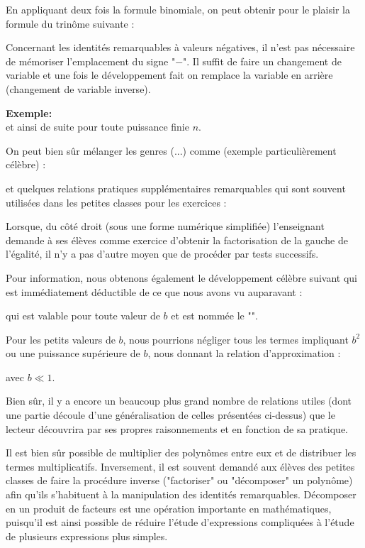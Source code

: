 	En appliquant deux fois la formule binomiale, on peut obtenir pour le plaisir la formule du trinôme suivante :
	
	Concernant les identités remarquables à valeurs négatives, il n'est pas nécessaire de mémoriser l'emplacement du signe "$-$". Il suffit de faire un changement de variable et une fois le développement fait on remplace la variable en arrière (changement de variable inverse).
	\begin{tcolorbox}[colframe=black,colback=white,sharp corners]
	\textbf{{\Large {}}Exemple:}\\
	
	et ainsi de suite pour toute puissance finie $n$.
	\end{tcolorbox}
	On peut bien sûr mélanger les genres (...) comme (exemple particulièrement célèbre) :
	
	et quelques relations pratiques supplémentaires remarquables qui sont souvent utilisées dans les petites classes pour les exercices :
	
	\begin{tcolorbox}[title=Remarque,colframe=black,arc=10pt]
	Lorsque, du côté droit (sous une forme numérique simplifiée) l'enseignant demande à ses élèves comme exercice d'obtenir la factorisation de la gauche de l'égalité, il n'y a pas d'autre moyen que de procéder par tests successifs.
	\end{tcolorbox}
	Pour information, nous obtenons également le développement célèbre suivant qui est immédiatement déductible de ce que nous avons vu auparavant :
	
	qui est valable pour toute valeur de $b$ et est nommée le "\label{binomial expansion}". 
	
	Pour les petits valeurs de $b$, nous pourrions négliger tous les termes impliquant $b^2$ ou une puissance supérieure de $b$, nous donnant la relation d'approximation :
	
	avec $b\ll 1$.
	
	Bien sûr, il y a encore un beaucoup plus grand nombre de relations utiles (dont une partie découle d'une généralisation de celles présentées ci-dessus) que le lecteur découvrira par ses propres raisonnements et en fonction de sa pratique.
	
	\begin{tcolorbox}[title=Remarque,colframe=black,arc=10pt]
	Il est bien sûr possible de multiplier des polynômes entre eux et de distribuer les termes multiplicatifs. Inversement, il est souvent demandé aux élèves des petites classes de faire la procédure inverse ("factoriser" ou "décomposer" un polynôme) afin qu'ils s'habituent à la manipulation des identités remarquables. Décomposer en un produit de facteurs est une opération importante en mathématiques, puisqu'il est ainsi possible de réduire l'étude d'expressions compliquées à l'étude de plusieurs expressions plus simples.
	\end{tcolorbox}
	
